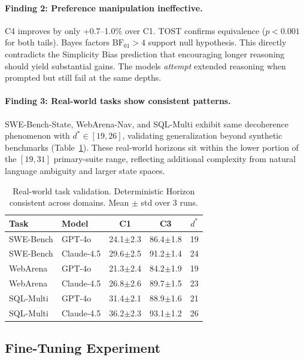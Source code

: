 \documentclass{article}
\theoremstyle{plain}
\theoremstyle{definition}
\theoremstyle{remark}
\begin{document}
\paragraph{Finding 2: Preference manipulation ineffective.} C4 improves by only +0.7--1.0\% over C1. TOST confirms equivalence ($p < 0.001$ for both tails). Bayes factors $\text{BF}_{01} > 4$ support null hypothesis. This directly contradicts the Simplicity Bias prediction that encouraging longer reasoning should yield substantial gains. The models \emph{attempt} extended reasoning when prompted but still fail at the same depths.

\paragraph{Finding 3: Real-world tasks show consistent patterns.} SWE-Bench-State, WebArena-Nav, and SQL-Multi exhibit same decoherence phenomenon with $d^* \in [19, 26]$, validating generalization beyond synthetic benchmarks (Table~\ref{tab:realworld}). These real-world horizons sit within the lower portion of the $[19, 31]$ primary-suite range, reflecting additional complexity from natural language ambiguity and larger state spaces.

\begin{table}[t]
\caption{Real-world task validation. Deterministic Horizon consistent across domains. Mean $\pm$ std over 3 runs.}
\label{tab:realworld}
\vskip 0.1in
\centering
\footnotesize
\begin{tabular}{@{}llccc@{}}
\toprule
\textbf{Task} & \textbf{Model} & \textbf{C1} & \textbf{C3} & \textbf{$d^*$} \\
\midrule
SWE-Bench & GPT-4o & 24.1$\pm$2.3 & 86.4$\pm$1.8 & 19 \\
SWE-Bench & Claude-4.5 & 29.6$\pm$2.5 & 91.2$\pm$1.4 & 24 \\
WebArena & GPT-4o & 21.3$\pm$2.4 & 84.2$\pm$1.9 & 19 \\
WebArena & Claude-4.5 & 26.8$\pm$2.6 & 89.7$\pm$1.5 & 23 \\
SQL-Multi & GPT-4o & 31.4$\pm$2.1 & 88.9$\pm$1.6 & 21 \\
SQL-Multi & Claude-4.5 & 36.2$\pm$2.3 & 93.1$\pm$1.2 & 26 \\
\bottomrule
\end{tabular}
\vskip -0.1in
\end{table}

\subsection{Fine-Tuning Experiment}
\label{sec:finetune}
\end{document}

